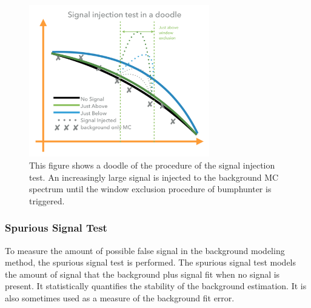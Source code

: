 

\begin{figure}[!htb]
    \begin{center}
        \includegraphics[width=0.7\textwidth]{figures/chapter_analysismethod/SignalInjectionTest}
        \caption{
            This figure shows a doodle of the procedure of the signal injection test. An increasingly large signal is injected to the background MC spectrum until the window exclusion procedure of bumphunter is triggered.
        }
        \label{signalinjection}
    \end{center}
\end{figure}
\FloatBarrier

\subsubsection{Spurious Signal Test} 
    \label{sec:spurious}

    To measure the amount of possible false signal in the background modeling method, the spurious signal test is performed. The spurious signal test models the amount of signal that the background plus signal fit when no signal is present.  It statistically quantifies the stability of the background estimation. It is also sometimes used as a measure of the background fit error.

